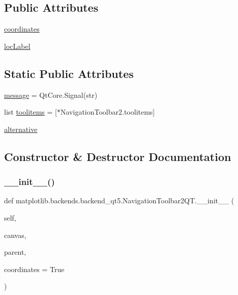 \subsection*{Public Attributes}
\begin{DoxyCompactItemize}
\item 
\hyperlink{classmatplotlib_1_1backends_1_1backend__qt5_1_1NavigationToolbar2QT_a59714a4d9560a09131687e980a80cdb5}{coordinates}
\item 
\hyperlink{classmatplotlib_1_1backends_1_1backend__qt5_1_1NavigationToolbar2QT_a95bca2d50fcde36d574b312025cace20}{loc\+Label}
\end{DoxyCompactItemize}
\subsection*{Static Public Attributes}
\begin{DoxyCompactItemize}
\item 
\hyperlink{classmatplotlib_1_1backends_1_1backend__qt5_1_1NavigationToolbar2QT_a6509951bb048540a1c505808ea652b05}{message} = Qt\+Core.\+Signal(str)
\item 
list \hyperlink{classmatplotlib_1_1backends_1_1backend__qt5_1_1NavigationToolbar2QT_a8317df9fc783ed11ea09fe78dd1ffd56}{toolitems} = \mbox{[}$\ast$Navigation\+Toolbar2.\+toolitems\mbox{]}
\item 
\hyperlink{classmatplotlib_1_1backends_1_1backend__qt5_1_1NavigationToolbar2QT_ad233cc1437e69f189554a423262b229c}{alternative}
\end{DoxyCompactItemize}


\subsection{Constructor \& Destructor Documentation}
\mbox{\label{classmatplotlib_1_1backends_1_1backend__qt5_1_1NavigationToolbar2QT_a63a165dfc0bd0b1657e1615efd5364a7}} 
\subsubsection{\texorpdfstring{\+\_\+\+\_\+init\+\_\+\+\_\+()}{\_\_init\_\_()}}
{\footnotesize\ttfamily def matplotlib.\+backends.\+backend\+\_\+qt5.\+Navigation\+Toolbar2\+Q\+T.\+\_\+\+\_\+init\+\_\+\+\_\+ (\begin{DoxyParamCaption}\item[{}]{self,  }\item[{}]{canvas,  }\item[{}]{parent,  }\item[{}]{coordinates = {\ttfamily True} }\end{DoxyParamCaption})}

